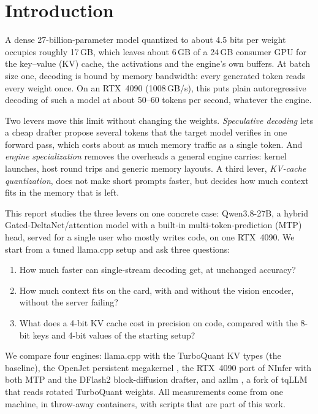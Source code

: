 \section{Introduction}
\label{sec:intro}

A dense 27-billion-parameter model quantized to about 4.5 bits per weight occupies roughly
17\,GB, which leaves about 6\,GB of a 24\,GB consumer GPU for the key--value (KV) cache, the
activations and the engine's own buffers. At batch size one, decoding is bound by memory
bandwidth: every generated token reads every weight once. On an RTX~4090 (1008\,GB/s), this
puts plain autoregressive decoding of such a model at about 50--60 tokens per second, whatever
the engine.

Two levers move this limit without changing the weights. \emph{Speculative decoding}
 lets a cheap drafter propose several tokens that the target model
verifies in one forward pass, which costs about as much memory traffic as a single token. And
\emph{engine specialization} removes the overheads a general engine carries: kernel launches,
host round trips and generic memory layouts. A third lever, \emph{KV-cache quantization}, does
not make short prompts faster, but decides how much context fits in the memory that is left.

This report studies the three levers on one concrete case: Qwen3.8-27B, a hybrid
Gated-DeltaNet/attention model with a built-in multi-token-prediction (MTP) head, served for a
single user who mostly writes code, on one RTX~4090. We start from a tuned llama.cpp setup and
ask three questions:

\begin{enumerate}
  \item How much faster can single-stream decoding get, at unchanged accuracy?
  \item How much context fits on the card, with and without the vision encoder, without the
        server failing?
  \item What does a 4-bit KV cache cost in precision on code, compared with the 8-bit keys
        and 4-bit values of the starting setup?
\end{enumerate}

We compare four engines: llama.cpp with the TurboQuant KV types \citep{llamacpp,turboquant}
(the baseline), the OpenJet persistent megakernel \citep{openjet}, the RTX~4090 port of NInfer
\citep{ninfer,ninfer4090} with both MTP and the DFlash2 block-diffusion drafter,
 and azllm \citep{azllm}, a fork of tqLLM \citep{tqllm} that reads
rotated TurboQuant weights. All measurements come from one machine, in throw-away containers,
with scripts that are part of this work.

